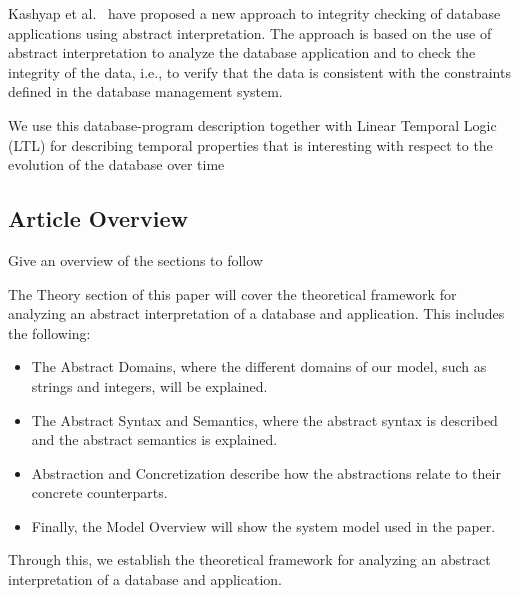 Kashyap et al.~\cite{kashyap_integrity_2022} have proposed a new approach to integrity checking of database applications using abstract interpretation.
The approach is based on the use of abstract interpretation to analyze the database application and to check the integrity of the data, i.e., to verify that the data is consistent with the constraints defined in the database management system.

We use this database-program description together with Linear Temporal Logic (LTL) for describing temporal properties that is interesting with respect to the evolution of the database over time

\subsection{Article Overview}\label{subsec:article-overview}
Give an overview of the sections to follow


The Theory section of this paper will cover the theoretical framework for analyzing an abstract interpretation of a database and application.
This includes the following:

\begin{itemize}
    \item The Abstract Domains, where the different domains of our model, such as strings and integers, will be explained.
    \item The Abstract Syntax and Semantics, where the abstract syntax is described and the abstract semantics is explained.
    \item Abstraction and Concretization describe how the abstractions relate to their concrete counterparts.
    \item Finally, the Model Overview will show the system model used in the paper.
\end{itemize}

Through this, we establish the theoretical framework for analyzing an abstract interpretation of a database and application.
